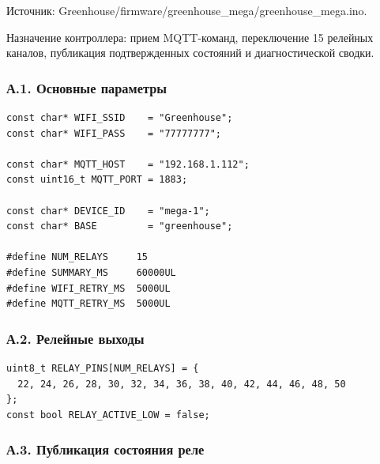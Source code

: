 \documentclass[a4paper,14pt]{extarticle}
\renewcommand{\texttt}[1]{\textnormal{#1}}
\begin{document}
Источник:
\texttt{Greenhouse/firmware/greenhouse\_mega/greenhouse\_mega.ino}.

Назначение контроллера: прием MQTT-команд, переключение 15 релейных
каналов, публикация подтвержденных состояний и диагностической сводки.

\hypertarget{ux430.1.-ux43eux441ux43dux43eux432ux43dux44bux435-ux43fux430ux440ux430ux43cux435ux442ux440ux44b}{%
\subsubsection{А.1. Основные
параметры}\label{ux430.1.-ux43eux441ux43dux43eux432ux43dux44bux435-ux43fux430ux440ux430ux43cux435ux442ux440ux44b}}

\par\noindent\begin{minipage}{\linewidth}
\begin{verbatim}
const char* WIFI_SSID    = "Greenhouse";
const char* WIFI_PASS    = "77777777";

const char* MQTT_HOST    = "192.168.1.112";
const uint16_t MQTT_PORT = 1883;

const char* DEVICE_ID    = "mega-1";
const char* BASE         = "greenhouse";

#define NUM_RELAYS     15
#define SUMMARY_MS     60000UL
#define WIFI_RETRY_MS  5000UL
#define MQTT_RETRY_MS  5000UL
\end{verbatim}
\end{minipage}\par

\hypertarget{ux430.2.-ux440ux435ux43bux435ux439ux43dux44bux435-ux432ux44bux445ux43eux434ux44b}{%
\subsubsection{А.2. Релейные
выходы}\label{ux430.2.-ux440ux435ux43bux435ux439ux43dux44bux435-ux432ux44bux445ux43eux434ux44b}}

\par\noindent\begin{minipage}{\linewidth}
\begin{verbatim}
uint8_t RELAY_PINS[NUM_RELAYS] = {
  22, 24, 26, 28, 30, 32, 34, 36, 38, 40, 42, 44, 46, 48, 50
};
const bool RELAY_ACTIVE_LOW = false;
\end{verbatim}
\end{minipage}\par

\hypertarget{ux430.3.-ux43fux443ux431ux43bux438ux43aux430ux446ux438ux44f-ux441ux43eux441ux442ux43eux44fux43dux438ux44f-ux440ux435ux43bux435}{%
\subsubsection{А.3. Публикация состояния
реле}\label{ux430.3.-ux43fux443ux431ux43bux438ux43aux430ux446ux438ux44f-ux441ux43eux441ux442ux43eux44fux43dux438ux44f-ux440ux435ux43bux435}}
\end{document}
